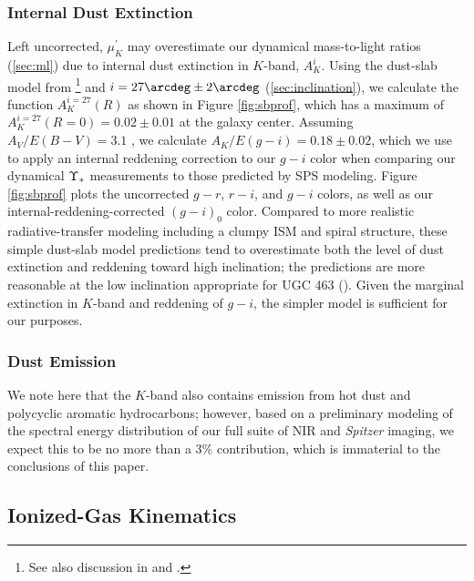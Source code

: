 \documentclass[apj,iop,numberedappendix]{emulateapj}
\begin{document}
\subsubsection{Internal Dust Extinction}
\label{sec:dustext}

Left uncorrected, $\mu^{\prime}_K$ may overestimate our dynamical mass-to-light
ratios (\sect \ref{sec:ml}) due to internal dust extinction in $K$-band,
$A^i_K$.  Using the dust-slab model from \citet{1985ApJS...58...67T}\footnote{
%
See also discussion in  and
.
%
} and $i=27\arcdeg\pm 2\arcdeg$ (\sect \ref{sec:inclination}), we calculate the
function $A^{i=27}_{K}(R)$ as shown in Figure \ref{fig:sbprof}, which has a
maximum of $A^{i=27}_{K}(R=0) = 0.02\pm 0.01$ at the galaxy center.  Assuming
$A_V/E(B-V) = 3.1$ \citep{1989ApJ...345..245C}, we calculate $A_K/E(g-i) =
0.18\pm0.02$, which we use to apply an internal reddening correction to our
$g-i$ color when comparing our dynamical $\Upsilon_\ast$ measurements to those predicted
by SPS modeling.  Figure \ref{fig:sbprof} plots the uncorrected $g-r$, $r-i$,
and $g-i$ colors, as well as our internal-reddening-corrected $(g-i)_0$ color.
Compared to more realistic radiative-transfer modeling including a clumpy ISM
and spiral structure, these simple dust-slab model predictions tend to
overestimate both the level of dust extinction and reddening toward high
inclination; the predictions are more reasonable at the low inclination
appropriate for UGC 463 (\dustt).  Given the marginal extinction in $K$-band and
reddening of $g-i$, the simpler model is sufficient for our purposes.

\subsubsection{Dust Emission}
\label{sec:dustem}

We note here that the $K$-band also contains emission from hot dust and
polycyclic aromatic hydrocarbons; however, based on a preliminary modeling of
the spectral energy distribution of our full suite of NIR and {\it Spitzer}
imaging, we expect this to be no more than a 3\% contribution, which is
immaterial to the conclusions of this paper.

\subsection{Ionized-Gas Kinematics}
\end{document}
